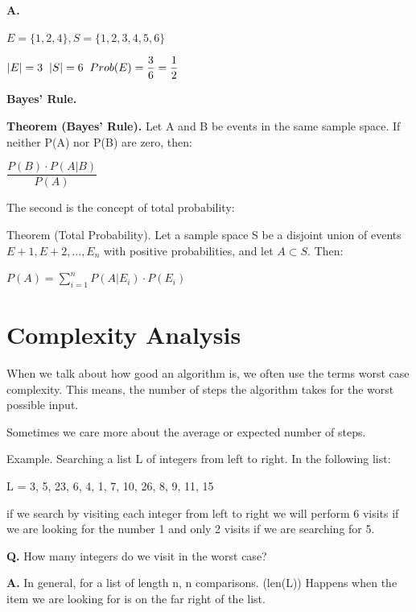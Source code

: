 \documentclass{article}
\begin{document}
\textbf{A.}

$E = \{1,2,4\}, S = \{1,2,3,4,5,6\}$

$|E| = 3 \hspace{0.2cm} |S| = 6 \hspace{0.2cm} Prob(E) = \dfrac{3}{6} = \dfrac{1}{2}$

\pagebreak

\text{}

\textbf{Bayes’ Rule.}

\textbf{Theorem (Bayes’ Rule).} Let A and B be events in the same
sample space. If neither P(A) nor P(B) are zero, then:

\centerline{$\dfrac{P(B) \cdot P(A|B)}{P(A)}$}

The second is the concept of total probability:

Theorem (Total Probability). Let a sample space S be a disjoint
union of events $E+1, E+2,...,E_n$ with positive probabilities, and let
$A \subset S$. Then:

$P(A) = \displaystyle \sum_{i = 1}^{n} P(A|E_i) \cdot P(E_i)$



\section{Complexity Analysis}

\onehalfspacing

When we talk about how good an algorithm is, we often use the
terms worst case complexity. This means, the number of steps
the algorithm takes for the worst possible input.

Sometimes we care more about the average or expected number
of steps.

Example. Searching a list L of integers from left to right. In the following list:

\centerline{L = 3, 5, 23, 6, 4, 1, 7, 10, 26, 8, 9, 11, 15}

if we search by visiting each integer from left to right we will perform
6 visits if we are looking for the number 1 and only 2 visits
if we are searching for 5.

\vspace{0.3cm}

\textbf{Q.} How many integers do we visit in the worst case?

\textbf{A.} In general, for a list of length n, n comparisons. (len(L)) Happens when the item we are looking for is on the far right of the list.
\end{document}
